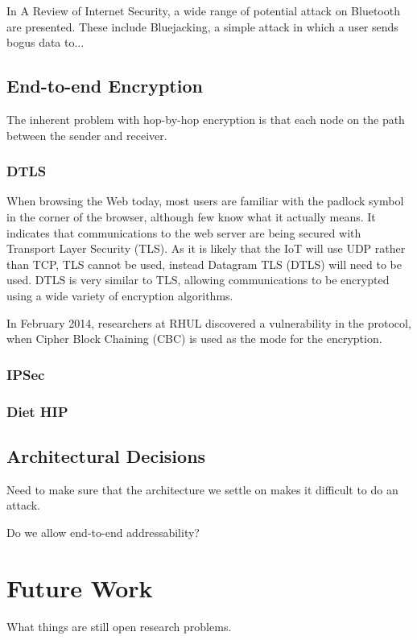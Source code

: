 \documentclass[10pt,journal,compsoc]{IEEEtran}
\begin{document}
In A Review of Internet Security, a wide range of potential attack on Bluetooth
are presented. These include Bluejacking, a simple attack in which a user sends
bogus data to... 


\subsection{End-to-end Encryption}
The inherent problem with hop-by-hop encryption is that each node on the path
between the sender and receiver.   

\subsubsection{DTLS}
When browsing the Web today, most users are familiar with the padlock symbol in
the corner of the browser, although few know what it actually means. It
indicates that communications to the web server are being secured with
Transport Layer Security (TLS). As it is likely that the IoT will use UDP
rather than TCP, TLS cannot be used, instead Datagram TLS (DTLS) will need to
be used. DTLS is very similar to TLS, allowing communications to be encrypted
using a wide variety of encryption algorithms.  

In February 2014, researchers at RHUL discovered a vulnerability in the
protocol, when Cipher Block Chaining (CBC) is used as the mode for the
encryption. 


\subsubsection{IPSec}


\subsubsection{Diet HIP}


\subsection{Architectural Decisions}
Need to make sure that the architecture we settle on makes it difficult to do an attack. 

Do we allow end-to-end addressability?

\section{Future Work}
What things are still open research problems. 
\end{document}
